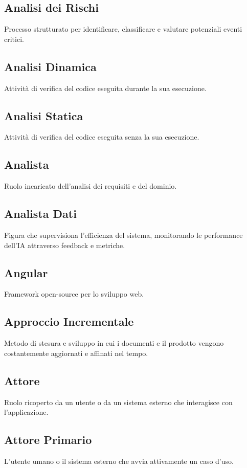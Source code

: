 \documentclass[a4paper,12pt]{article}
\begin{document}
\subsection{Analisi dei Rischi}
Processo strutturato per identificare, classificare e valutare potenziali eventi critici.

\subsection{Analisi Dinamica}
Attività di verifica del codice eseguita durante la sua esecuzione.

\subsection{Analisi Statica}
Attività di verifica del codice eseguita senza la sua esecuzione.

\subsection{Analista}
Ruolo incaricato dell'analisi dei requisiti e del dominio.

\subsection{Analista Dati}
Figura che supervisiona l'efficienza del sistema, monitorando le performance dell'IA attraverso feedback e metriche.

\subsection{Angular}
Framework open-source per lo sviluppo web.

\subsection{Approccio Incrementale}
Metodo di stesura e sviluppo in cui i documenti e il prodotto vengono costantemente aggiornati e affinati nel tempo.

\subsection{Attore}
Ruolo ricoperto da un utente o da un sistema esterno che interagisce con l'applicazione.

\subsection{Attore Primario}
L'utente umano o il sistema esterno che avvia attivamente un caso d'uso.
\end{document}
